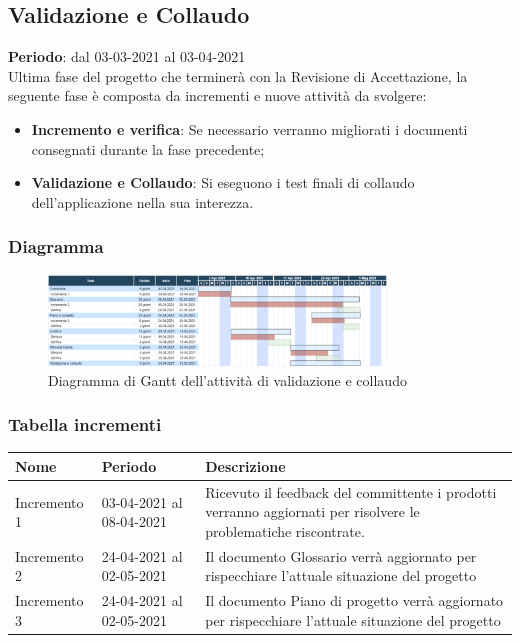 	\subsection{Validazione e Collaudo}
	\textbf{Periodo}: dal 03-03-2021 al 03-04-2021 \\
	Ultima fase del progetto che terminerà con la Revisione di Accettazione, la seguente fase è composta da incrementi e nuove attività da svolgere:
	\begin{itemize}
		\item \textbf{Incremento e verifica}: Se necessario verranno migliorati i documenti consegnati durante la fase precedente;
		\item \textbf{Validazione e Collaudo}: Si eseguono i test finali di collaudo dell'applicazione nella sua interezza.
	\end{itemize}
	
	\subsubsection{Diagramma}
		\begin{figure}[H]
        		\centering
        		\includegraphics[width=0.8\textwidth]{source/img/Validazione_collaudo.png}
        		\caption{Diagramma di Gantt dell'attività di validazione e collaudo}
    		\end{figure}
	\subsubsection{Tabella incrementi}
		\begin{center}
    			\begin{tabular}{ | l | p{5cm} | p{8cm} |}
   			 	\hline
    			Nome & Periodo & Descrizione \\ \hline
    			Incremento 1 & 03-04-2021 al 08-04-2021 & Ricevuto il feedback del committente i prodotti verranno aggiornati per risolvere le problematiche riscontrate. \\ \hline
    			Incremento 2 & 24-04-2021 al 02-05-2021 & Il documento Glossario verrà aggiornato per rispecchiare l'attuale situazione del progetto \\ \hline
			Incremento 3 & 24-04-2021 al 02-05-2021 & Il documento Piano di progetto verrà aggiornato per rispecchiare l'attuale situazione del progetto \\ \hline
    			\end{tabular}
		\end{center}
